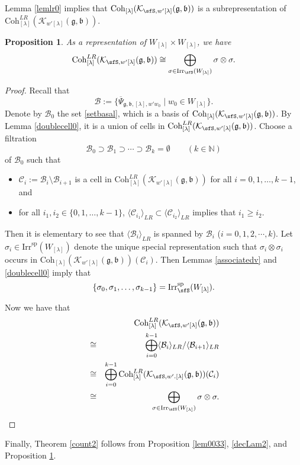 \documentclass[12pt,a4paper]{amsart}
\newcommand{\BN}{{\mathbb {N}}}
\newcommand{\CB}{{\mathcal {B}}}
\newcommand{\CC}{{\mathcal {C}}}
\newcommand{\CK}{{\mathcal {K}}}
\newcommand{\g}{\mathfrak g}
\renewcommand{\b}{\mathfrak b}
\newcommand{\la}{\langle}
\newcommand{\ra}{\rangle}
\numberwithin{equation}{section}
\newtheorem{prop}[thm]{Proposition}
\theoremstyle{remark}
\def\Irr{\mathrm{Irr}}
\def\Coh{\mathrm{Coh}}
\newcommand{\Lam}{{[\lambda]}}
\begin{document}
Lemma \ref{lemlr0} implies that $  \Coh_{\Lam}( \CK_{\sfS, w'\Lam}(\g,\b))$ is a subrepresentation of $\Coh^{LR}_{\Lam}( \CK_{w'\Lam}(\g,\b))$.
\begin{prop}\label{cohbbs}
As a representation of $W_\Lam\times W_\Lam$, we have
\[
  \Coh^{LR}_{\Lam}( \CK_{\sfS, w'\Lam}(\g,\b))\cong \bigoplus_{\sigma\in \Irr_\sfS(W_\Lam)} \sigma\otimes \sigma.
\]

\end{prop}
\begin{proof}
Recall that
\[
  \CB:= \{ \overline \Psi_{\g,\b, \Lam, w'w_0}\mid w_0\in W_\Lam\}.
\]
Denote by $\CB_0$ the set \eqref{setbasal}, which is a basis of $\Coh_{\Lam}( \CK_{\sfS, w'\Lam}(\g,\b))$. By Lemma \ref{doublecell0}, it is a union of cells in  $\Coh^{LR}_{\Lam}( \CK_{\sfS, w'\Lam}(\g,\b))$. Choose a filtration
\[
  \CB_0\supset \mathcal B_1\supset \cdots \supset \mathcal B_k=\emptyset \qquad (k\in \BN)
\]
of $\CB_0$
such that
\begin{itemize}
\item
$\mathcal C_i:=\mathcal B_i\setminus \mathcal B_{i+1}$ is a cell in $\Coh^{LR}_{\Lam}( \CK_{ w'\Lam}(\g,\b))$ for all $i=0,1, \dots, k-1$, and
\item
for all $i_1, i_2\in \{0,1, \dots, k-1\}$,   $\la \CC_{i_1}\ra_{LR} \subset \la \CC_{i_2}\ra_{LR}$ implies that $i_1\geq i_2$.
\end{itemize}
Then it is elementary to see that  $\la \CB_i\ra_{LR}$ is spanned by $\CB_i$ ($i=0, 1,2, \cdots ,k$). Let $\sigma_i\in \Irr^{\mathrm{sp}}(W_\Lam)$ denote the unique special representation such that $\sigma_i\otimes \sigma_i$ occurs in $\Coh_{\Lam}( \CK_{w'\Lam}(\g,\b))(\CC_i)$. Then Lemmas \ref{associatedv} and \ref{doublecell0} imply that
\[
\{\sigma_0, \sigma_1, \dots, \sigma_{k-1}\}= \Irr_\sfS^{\mathrm{sp}}(W_\Lam).
\]

Now we have that
\begin{eqnarray*}
   &&\Coh^{LR}_{\Lam}( \CK_{\sfS, w'\Lam}(\g,\b))\\
   &\cong & \bigoplus_{i=0}^{k-1}  \la \CB_i\ra_{LR}/\la \CB_{i+1}\ra_{LR}\\
    &\cong & \bigoplus_{i=0}^{k-1}   \Coh^{LR}_{\Lam}( \CK_{\sfS, w'.\Lam}(\g,\b))(\CC_i)\\
    &\cong &\bigoplus_{\sigma\in \Irr_\sfS(W_\Lam)} \sigma\otimes \sigma.
\end{eqnarray*}
\end{proof}

Finally, Theorem \ref{count2} follows from Proposition \ref{lem0033}, \eqref{decLam2}, and Proposition \ref{cohbbs}.
\end{document}
